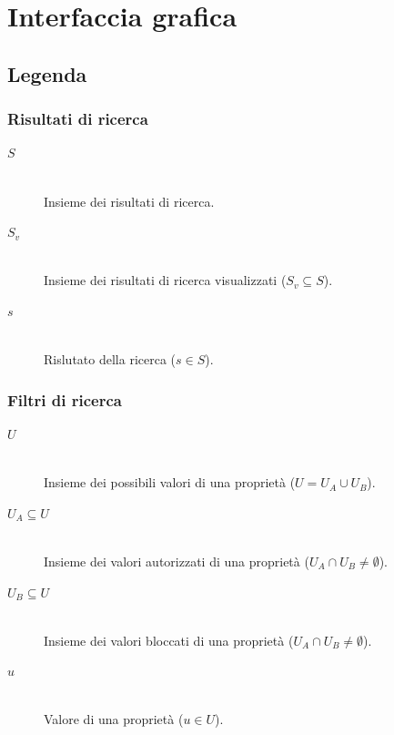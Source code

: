 \chapter{Interfaccia grafica}
\label{ch:appendice:interfaccia-grafica}

\section*{Legenda}

\subsection*{Risultati di ricerca}
\begin{description}
	\item[$S$] \hfill \\
	Insieme dei risultati di ricerca.
	\item[$S_v$] \hfill \\
	Insieme dei risultati di ricerca visualizzati ($S_v \subseteq S$).
	\item[$s$] \hfill \\
	Rislutato della ricerca ($s \in S$).
\end{description}

\subsection*{Filtri di ricerca}
\begin{description}
	\item[$U$] \hfill \\
	Insieme dei possibili valori di una proprietà ($U = U_A \cup U_B$).
	\item[$U_A \subseteq U$] \hfill \\
	Insieme dei valori autorizzati di una proprietà ($U_A \cap U_B \neq \emptyset$).
	\item[$U_B \subseteq U$] \hfill \\
	Insieme dei valori bloccati di una proprietà ($U_A \cap U_B \neq \emptyset$).
	\item[$u$] \hfill \\
	Valore di una proprietà ($u \in U$).
\end{description}


